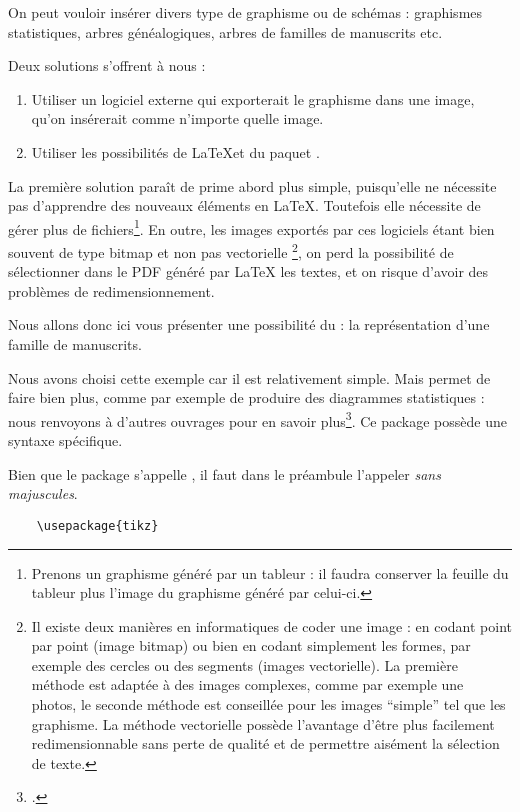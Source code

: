 On peut vouloir insérer divers type de graphisme ou de schémas : graphismes statistiques, arbres généalogiques, arbres de familles de manuscrits etc.

Deux solutions s'offrent à nous :
\begin{enumerate}
\item Utiliser un logiciel externe qui exporterait le graphisme dans une image, qu'on insérerait comme n'importe quelle image.
\item Utiliser les possibilités de \LaTeX et du paquet .
\end{enumerate}

La première solution paraît de prime abord plus simple, puisqu'elle ne nécessite pas d'apprendre des nouveaux éléments en \LaTeX. Toutefois elle nécessite de gérer plus de fichiers\footnote{Prenons un graphisme généré par un tableur : il faudra conserver la feuille du tableur plus l'image du graphisme généré par celui-ci.}. En outre, les images exportés par ces logiciels étant bien souvent de type bitmap et non pas vectorielle%
\footnote{Il existe deux manières en informatiques de coder une image : en codant point par point (image bitmap) ou bien en codant simplement les formes, par exemple des cercles ou des segments (images vectorielle). La première méthode est adaptée à des images complexes, comme par exemple une photos,  le seconde méthode est conseillée pour les images \enquote{simple} tel que les graphisme. La méthode vectorielle possède l'avantage d'être plus facilement redimensionnable  sans perte de qualité et de permettre aisément la sélection de texte.},
on perd la possibilité de sélectionner dans le PDF généré par LaTeX les textes, et on risque d'avoir des problèmes de redimensionnement.

Nous allons donc ici vous présenter une possibilité du  : la représentation d'une famille de manuscrits. 

Nous avons choisi cette exemple car il est relativement simple. Mais  permet de faire bien plus, comme par exemple de produire des diagrammes statistiques : nous renvoyons à d'autres ouvrages pour en savoir plus\footcites[Outre le manuel on pourra lire][]{tikzimpatient}[on pourra également consulter le site ][]{tikzexample}.
Ce package possède une syntaxe spécifique. 

\begin{attention}
	Bien que le package s'appelle , il faut dans le préambule l'appeler \emph{sans majuscules}.
	\begin{verbatim}
	\usepackage{tikz}
	\end{verbatim} 
\end{attention}


